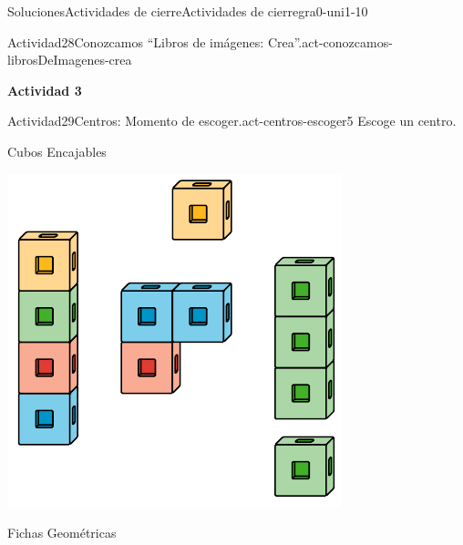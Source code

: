 \documentclass[twoside,10pt,]{article}
\begin{document}
\begin{solutions-section}{Soluciones}{Actividades de cierre}{}{Actividades de cierre}{}{}{gra0-uni1-10}
\begin{activitysolution}{Actividad}{28}{Conozcamos “Libros de imágenes: Crea”.}{act-conozcamos-librosDeImagenes-crea}
\begin{sidebyside}{2}{0.3}{0.3}{0}
\begin{sbspanel}{0.2}
\end{sbspanel}%
\end{sidebyside}%
\end{activitysolution}%
\par\medskip
\noindent\textbf{\large{}\space\textperiodcentered\space{}Actividad 3}
\begin{activitysolution}{Actividad}{29}{Centros: Momento de escoger.}{act-centros-escoger5}%
Escoge un centro.%
\begin{sidebyside}{2}{0.025}{0.025}{0.05}%
\begin{sbspanel}{0.45}%
Cubos Encajables%
\par
\includegraphics[width=\linewidth]{external/svg-source/tikz-file-128850.pdf}
\end{sbspanel}%
\begin{sbspanel}{0.45}%
Fichas Geométricas%
\par

\end{sbspanel}
\end{sidebyside}
\end{activitysolution}
\end{solutions-section}
\end{document}
